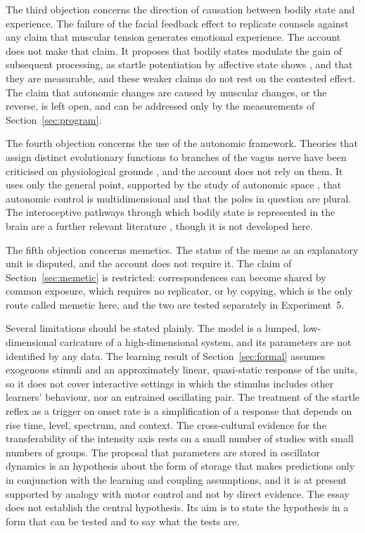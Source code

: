 \documentclass[11pt]{article}
\theoremstyle{plain}
\theoremstyle{definition}
\begin{document}
The third objection concerns the direction of causation between bodily state and experience. The failure of the facial feedback effect to replicate \citep{wagenmakers2016} counsels against any claim that muscular tension generates emotional experience. The account does not make that claim. It proposes that bodily states modulate the gain of subsequent processing, as startle potentiation by affective state shows \citep{lang1990}, and that they are measurable, and these weaker claims do not rest on the contested effect. The claim that autonomic changes are caused by muscular changes, or the reverse, is left open, and can be addressed only by the measurements of Section~\ref{sec:program}.

The fourth objection concerns the use of the autonomic framework. Theories that assign distinct evolutionary functions to branches of the vagus nerve have been criticised on physiological grounds \citep{grossman2007}, and the account does not rely on them. It uses only the general point, supported by the study of autonomic space \citep{berntson1991}, that autonomic control is multidimensional and that the poles in question are plural. The interoceptive pathways through which bodily state is represented in the brain are a further relevant literature \citep{craig2002}, though it is not developed here.

The fifth objection concerns memetics. The status of the meme as an explanatory unit is disputed, and the account does not require it. The claim of Section~\ref{sec:memetic} is restricted: correspondences can become shared by common exposure, which requires no replicator, or by copying, which is the only route called memetic here, and the two are tested separately in Experiment~5.

Several limitations should be stated plainly. The model is a lumped, low-dimensional caricature of a high-dimensional system, and its parameters are not identified by any data. The learning result of Section~\ref{sec:formal} assumes exogenous stimuli and an approximately linear, quasi-static response of the units, so it does not cover interactive settings in which the stimulus includes other learners' behaviour, nor an entrained oscillating pair. The treatment of the startle reflex as a trigger on onset rate is a simplification of a response that depends on rise time, level, spectrum, and context. The cross-cultural evidence for the transferability of the intensity axis rests on a small number of studies with small numbers of groups. The proposal that parameters are stored in oscillator dynamics is an hypothesis about the form of storage that makes predictions only in conjunction with the learning and coupling assumptions, and it is at present supported by analogy with motor control and not by direct evidence. The essay does not establish the central hypothesis. Its aim is to state the hypothesis in a form that can be tested and to say what the tests are.
\end{document}
